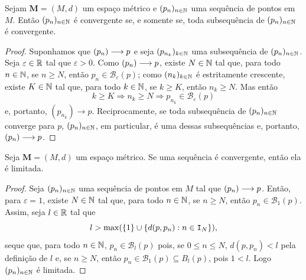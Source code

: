 \begin{prop}
	Sejam $\bm M = (M,d)$ um espaço métrico e $(p_n)_{n \in \mathbb{N}}$ uma sequência de pontos em $M$. Então $(p_n)_{n \in \mathbb{N}}$ é convergente se, e somente se, toda subsequência de $(p_n)_{n \in \mathbb{N}}$ é convergente.
\end{prop}
\begin{proof}
	Suponhamos que $(p_n) \longrightarrow p$ e seja $(p_{n_k})_{k \in \mathbb{N}}$ uma subsequência de $(p_n)_{n \in \mathbb{N}}$. Seja $\varepsilon \in \mathbb{R}$ tal que $\varepsilon > 0$. Como $(p_n) \longrightarrow p$, existe $N \in \mathbb{N}$ tal que, para todo $n \in \mathbb{N}$, se $n \geq N$, então $p_n \in \mathcal B_\varepsilon(p)$; como $(n_k)_{k \in \mathbb{N}}$ é estritamente crescente, existe $K \in \mathbb{N}$ tal que, para todo $k \in \mathbb{N}$, se $k \geq K$, então $n_k \geq N$. Mas então
	\begin{equation*}
	k \geq K \Rightarrow n_k \geq N \Rightarrow p_{n_k} \in \mathcal B_\varepsilon(p)
	\end{equation*}
e, portanto, $(p_{n_k}) \to p$.	Reciprocamente, se toda subsequência de $(p_n)_{n \in \mathbb{N}}$ converge para $p$, $(p_n)_{n \in \mathbb{N}}$, em particular, é uma dessas subsequências e, portanto, $(p_n) \longrightarrow p$.
\end{proof}

\begin{prop}
	Seja $\bm M = (M,d)$ um espaço métrico. Se uma sequência é convergente, então ela é limitada.
\end{prop}
\begin{proof}
	Seja $(p_n)_{n \in \mathbb{N}}$ uma sequência de pontos em $M$ tal que $(p_n) \longrightarrow p$. Então, para $\varepsilon = 1$, existe $N \in \mathbb{N}$ tal que, para todo $n \in \mathbb{N}$, se $n \geq N$, então $p_n \in \mathcal B_1(p)$. Assim, seja $l \in \mathbb{R}$ tal que
	\begin{equation*}
	l > \max(\{1\} \cup \{d(p,p_n) : n \in \mathtt I_N\}),
	\end{equation*}
seque que, para todo $n \in \mathbb{N}$, $p_n \in \mathcal B_l(p)$ pois, se $0 \leq n \leq N$, $d(p,p_n) < l$ pela definição de $l$ e, se $n \geq N$, então $p_n \in \mathcal B_1(p) \subseteq B_l(p)$, pois $1 < l$. Logo $(p_n)_{n \in \mathbb{N}}$ é limitada.
\end{proof}

